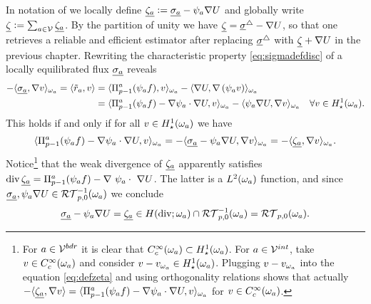 \documentclass[thesis.tex]{subfiles}
\begin{document}
In notation of \cite{ernequil} we locally define $\underline{\zeta_a} := \underline{\sigma_a} - \psi_a \nabla U$ and globally write $\underline{\zeta} := \sum_{a \in \mathcal{V}} \underline{\zeta_a}$.
By the partition of unity we have 
$ \underline{\zeta} = \underline{\sigma}^\triangle - \nabla U$, so that one retrieves a reliable and efficient estimator after replacing $\underline{\sigma}^\triangle$ with $\underline{\zeta} + \nabla U$ in the previous
chapter. Rewriting the characteristic property \eqref{eq:sigmadefdisc} of a locally equilibrated flux $\underline{\sigma_a}$ reveals
\begin{align*}
  -\langle \underline{\sigma_a}, \nabla v \rangle_{\omega_a}  = \langle \tilde r_a, v \rangle &=  \langle \Pi_{p-1}^a(\psi_a f), v \rangle_{\omega_a} - \langle \nabla U, \nabla \left(\psi_a v\right) \rangle_{\omega_a} \\
  &=  \langle \Pi_{p-1}^a(\psi_a f) - \nabla \psi_a \cdot \nabla U, v \rangle_{\omega_a} - \langle \psi_a \nabla U, \nabla v \rangle_{\omega_a} \quad \forall v \in H_\star^1(\omega_a).
\end{align*}
This holds if and only if for all $v \in H_\star^1(\omega_a)$ we have 
\begin{equation}
  \label{eq:defzeta}
  \langle \Pi_{p-1}^a(\psi_a f) - \nabla \psi_a \cdot \nabla U, v \rangle_{\omega_a} = - \langle \underline{\sigma_a} - \psi_a \nabla U, \nabla v \rangle_{\omega_a} = - \langle \underline{\zeta_a}, \nabla v \rangle_{\omega_a}.
\end{equation}
Notice\footnote{
For $a\in \mathcal{V}^{bdr}$ it is clear that $C_c^{\infty}(\omega_a) \subset H_\star^1(\omega_a)$. For $a \in \mathcal{V}^{int}$, take $v \in C_c^{\infty}(\omega_a)$ and consider $v - v_{\omega_a} \in H_\star^1(\omega_a)$. Plugging $v - v_{\omega_a}$ into the equation \eqref{eq:defzeta} and using orthogonality relations shows that actually $ - \langle \underline{\zeta_a}, \nabla v \rangle = \langle \Pi_{p-1}^a(\psi_a f) - \nabla \psi_a \cdot \nabla U, v \rangle_{\omega_a}$ for $v \in C_c^{\infty}(\omega_a)$.}
that the weak divergence of $\underline{\zeta_a}$ apparently satisfies  $\operatorname{div} \underline{\zeta_a} = \Pi_{p-1}^a(\psi_a f) - \nabla~\psi_a\cdot~\nabla U$.
The latter is a $L^2(\omega_a)$ function, and since
 $\underline{\sigma_a},\psi_a\nabla U \in \mathcal{RT}_{p,0}^{-1}(\omega_a)$ we conclude
\[
 \underline{\sigma_a} - \psi_a \nabla U  = \underline{\zeta_a} \in H(\operatorname{div}; \omega_a) \cap \mathcal{RT}_{p,0}^{-1}(\omega_a) = \mathcal{RT}_{p,0}(\omega_a).
\]
\end{document}
